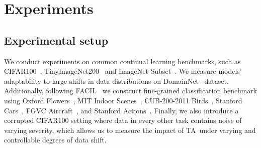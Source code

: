 \documentclass[10pt,twocolumn,letterpaper]{article}
\newcommand\rev[1]{{#1}}
\newcommand\ta{TA}
\begin{document}


\section{Experiments}

\subsection{Experimental setup}
\label{sec:exp:setup}

\rev{
We conduct experiments on common continual learning benchmarks, such as CIFAR100~\cite{Krizhevsky2009LearningML}, TinyImageNet200~\cite{abai2019densenet} and ImageNet-Subset~\cite{deng2009_imagenet}. We measure models’ adaptability to large shifts in data distributions on DomainNet~\cite{peng2019moment} dataset. Additionally, following FACIL~\cite{masana2022class} we construct fine-grained classification benchmark using Oxford Flowers~\cite{nilsback2008automated}, MIT Indoor Scenes~\cite{quattoni2009recognizing}, CUB-200-2011 Birds~\cite{wah2011caltech}, Stanford Cars~\cite{krause20133d}, FGVC Aircraft~\cite{maji2013fine}, and Stanford Actions~\cite{yao2011human}. Finally, we also introduce a corrupted CIFAR100 setting where data in every other task contains noise of varying severity, which allows us to measure the impact of \ta\ under varying and controllable degrees of data shift.
}
\end{document}
